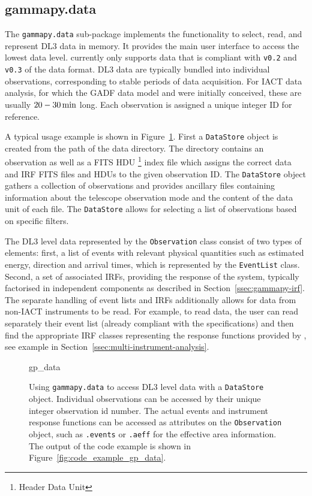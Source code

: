 \documentclass[longauth]{aa}
\newcommand{\code}[1]{\texttt{#1}}
\begin{document}
\subsection{gammapy.data}
\label{ssec:gammapy-data}
The \code{gammapy.data} sub-package implements the functionality to select,
read, and represent DL3 \gammaray data in memory. It provides the main user
interface to access the lowest data level. \gammapy currently only
supports data that is compliant with \code{v0.2} and \code{v0.3} of the \gadf data format.
DL3 data are typically bundled into individual observations, corresponding to stable periods of data acquisition. For IACT data analysis,
for which the GADF data model and \gammapy were initially conceived,
these are usually $20 - 30\,{\rm min}$ long.
Each observation is assigned a unique integer ID for reference.

A typical usage example is shown in Figure~\ref{fig*:minted:gp_data}.
First a \code{DataStore} object is created from the path of the data
directory. The directory contains an observation as well as a FITS HDU \footnote{Header Data Unit} 
index file which assigns the correct data and IRF FITS files and HDUs
to the given observation ID. The \code{DataStore}
object gathers a collection of observations and provides ancillary
files containing information about the telescope observation mode and the
content of the data unit of each file. The \code{DataStore} allows for
selecting a list of observations based on specific filters.

The DL3 level data represented by the \code{Observation} class consist
of two types of elements: first, a list of \gammaray events with relevant physical
quantities such as estimated energy, direction and arrival
times, which is represented by the \code{EventList} class. Second, a set of
associated IRFs, providing the response of the system, typically
factorised in independent components as described in
Section~\ref{ssec:gammapy-irf}. The separate handling of event lists and IRFs
additionally allows for data from non-IACT \gammaray instruments to be read. For
example, to read \fermi data, the user can read separately their event list
(already compliant with the \gadf specifications) and then find the appropriate
IRF classes representing the response functions provided by \fermi, see
example in Section~\ref{ssec:multi-instrument-analysis}.

\begin{figure}
	\small
	{gp_data}
	\caption{
        Using \code{gammapy.data} to access DL3 level data with a \code{DataStore} object.
        Individual observations can be accessed by their unique integer observation id number.
        The actual events and instrument response functions can be accessed
        as attributes on the \code{Observation} object, such as \code{.events}
        or \code{.aeff} for the effective area information. The output
		of the code example is shown in Figure~\ref{fig:code_example_gp_data}.
    }
	\label{fig*:minted:gp_data}
\end{figure}
%
\end{document}
